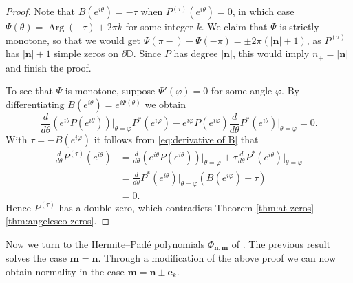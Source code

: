 \documentclass[reqno,centertags,11pt,draft]{amsart}
\newcommand{\D}{\mathbb{D}}
\renewcommand{\d}{\partial}
\newcommand{\abs}[1]{\left|#1\right|}
\newcommand{\brkt}[1]{\left(#1\right)}
\begin{document}
\begin{proof}
    Note that $B(e^{i\theta}) = -\tau$ when $P^{(\tau)}(e^{i\theta}) = 0$, in which case $\Psi(\theta) = \operatorname{Arg}(-\tau) + 2\pi k$ for some integer $k$. We claim that $\Psi$ is strictly monotone, so that we would get $\Psi(\pi-) - \Psi(-\pi) = \pm2\pi (\abs{\bm{n}}+1)$, as $P^{(\tau)}$ has $\abs{\bm{n}}+1$ simple zeros on $\d\D$. Since $P$ has degree $\abs{\bm{n}}$, this would imply $n_+ = \abs{\bm{n}}$ and finish the proof. 

    To see that $\Psi$ is monotone, suppose $\Psi'(\varphi) = 0$ for some angle $\varphi$. %
    By differentiating $B(e^{i\theta}) = e^{i\Psi(\theta)}$ we obtain
    \begin{equation}\label{eq:derivative of B}
        \frac{d}{d\theta}(e^{i\theta}P(e^{i\theta}))\Bigg|_{\theta = \varphi}P^*(e^{i\varphi})-e^{i\varphi}P(e^{i\varphi})\frac{d}{d\theta}P^*(e^{i\theta})\Bigg|_{\theta = \varphi} = 0.
    \end{equation}
    With $\tau = -B(e^{i\varphi})$ it follows from \eqref{eq:derivative of B} that
    \begin{align*}
        \frac{d}{d\theta}P^{(\tau)}(e^{i\theta}) & = \frac{d}{d\theta}(e^{i\theta}P(e^{i\theta}))\Bigg|_{\theta = \varphi} + \tau \frac{d}{d\theta}P^*(e^{i\theta})\Bigg|_{\theta = \varphi} \\ & = \frac{d}{d\theta}P^*(e^{i\theta})\Bigg|_{\theta = \varphi}\brkt{B(e^{i\varphi}) + \tau} \\ & = 0.
    \end{align*}
    Hence $P^{(\tau)}$ has a double zero, which contradicts Theorem \ref{thm:at zeros}-\ref{thm:angelesco zeros}.
\end{proof}

Now we turn to the Hermite--Pad\'e polynomials $\Phi_{\bm{n},\bm{m}}$ of \cite{KVHP}. The previous result solves the case $\bm{m} = \bm{n}$. Through a modification of the above proof we can now obtain normality in the case $\bm{m} = \bm{n}\pm\bm{e}_k$. 
\end{document}
